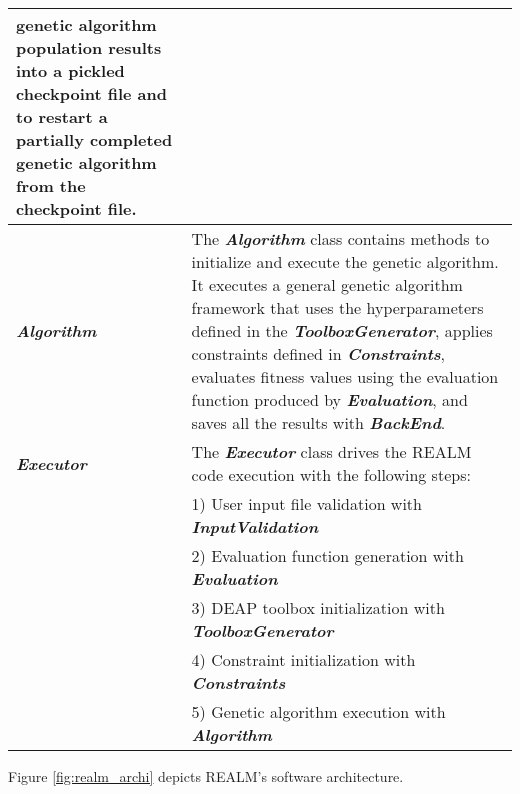 \begin{table}[]
\begin{tabular}{l|p{}}
    genetic algorithm population results into a pickled checkpoint file and to 
    restart a partially completed genetic algorithm from the checkpoint file. \\
    \hline
    \textbf{\textit{Algorithm}} & The \textbf{\textit{Algorithm}} class contains methods to 
    initialize and execute the genetic algorithm. It executes a general genetic 
    algorithm framework that uses the hyperparameters defined in the 
    \textbf{\textit{ToolboxGenerator}}, applies constraints defined in
    \textbf{\textit{Constraints}}, evaluates fitness values using the evaluation 
    function produced by \textbf{\textit{Evaluation}}, and saves all the results 
    with \textbf{\textit{BackEnd}}. \\
    \hline
    \textbf{\textit{Executor}} & The \textbf{\textit{Executor}} class drives the \gls{REALM} code
    execution with the following steps: \\
    & 1) User input file validation with \textbf{\textit{InputValidation}} \\
    & 2) Evaluation function generation with \textbf{\textit{Evaluation}} \\
    & 3) \gls{DEAP} toolbox initialization with \textbf{\textit{ToolboxGenerator}} \\ 
    & 4) Constraint initialization with \textbf{\textit{Constraints}} \\ 
    & 5) Genetic algorithm execution with \textbf{\textit{Algorithm}} \\
    \hline
    \end{tabular}
    \end{table}
Figure \ref{fig:realm_archi} depicts \gls{REALM}'s software architecture. 
